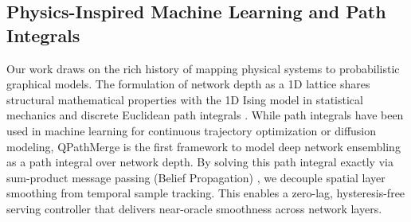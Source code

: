 \subsection{Physics-Inspired Machine Learning and Path Integrals}
Our work draws on the rich history of mapping physical systems to probabilistic graphical models. The formulation of network depth as a 1D lattice shares structural mathematical properties with the 1D Ising model in statistical mechanics \cite{ising1925beitrag} and discrete Euclidean path integrals \cite{feynman1948space, feynman2010quantum}. While path integrals have been used in machine learning for continuous trajectory optimization or diffusion modeling, QPathMerge is the first framework to model deep network ensembling as a path integral over network depth. By solving this path integral exactly via sum-product message passing (Belief Propagation) \cite{belief_prop_pearl, exact_sum_product}, we decouple spatial layer smoothing from temporal sample tracking. This enables a zero-lag, hysteresis-free serving controller that delivers near-oracle smoothness across network layers.
